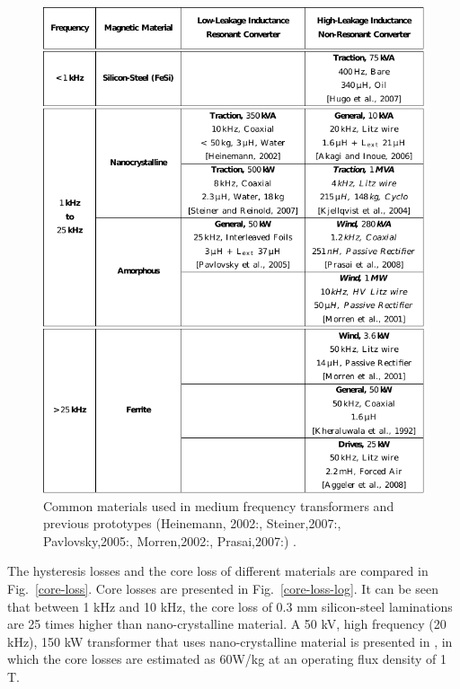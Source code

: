 \documentclass[a4paper, 11pt]{article} %
\begin{document}
\begin{figure}[]
  \centering
    \includegraphics[]{material_table_villar_2010}
  \caption{Common materials used in medium frequency transformers and previous prototypes (Heinemann, 2002:\cite{Heinemann2002}, Steiner,2007:\cite{Steiner2007}, Pavlovsky,2005:\cite{Pavlovsky2005}, Morren,2002:\cite{Morren2002}, Prasai,2007:\cite{Prasai2007}) \cite{Villar2010}.}
  \label{material_table}
\end{figure}

The hysteresis losses and the core loss of different materials are compared in Fig.~\ref{core-loss}. Core losses are presented in Fig.~\ref{core-loss-log}. It can be seen that between 1 kHz and 10 kHz, the core loss of 0.3 mm silicon-steel laminations are 25 times higher than nano-crystalline material. 
A 50 kV, high frequency (20 kHz), 150 kW transformer that uses nano-crystalline material is presented in \cite{Filchev2009}, in which the core losses are estimated as 60W/kg at an operating flux density of 1 T.
\end{document}
